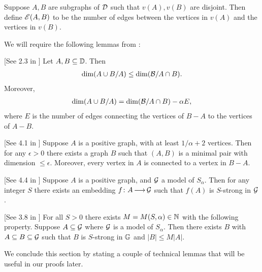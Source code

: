 \documentclass{amsart}
\begin{document}
\begin{Definition} \label{def_e}
  Suppose $A, B$ are subgraphs of $\mathcal D$ such that $v(A), v(B)$ are disjoint.
  Then define $\mathscr E(A, B)$ to be the number of edges between the vertices in $v(A)$ and the vertices in $v(B)$.
\end{Definition}

We will require the following lemmas from \cite{laskowski}:

\begin{Lemma} \label{diamond} [See 2.3 in \cite{laskowski}]
  Let $A, B \subseteq \mathbb D$.
  Then
  \begin{align*}
    \dim(A \cup B / A) \leq \dim(\mathcal B / A \cap B).
  \end{align*}
  Moreover, 
  \begin{align*}
    \dim(A \cup B / A) = \dim(\mathcal B / A \cap B) - \alpha E,
  \end{align*}
  where $E$ is the number of edges connecting the vertices of $B - A$ to the vertices of $A - B$.
\end{Lemma}

\begin{Lemma} \label{las_min} [See 4.1 in \cite{laskowski}]
  Suppose $A$ is a positive graph, with at least $1/\alpha + 2$ vertices.
  Then for any $\epsilon > 0$ there exists a graph $B$ such that $(A, B)$ is a minimal pair with dimension $\leq \epsilon$.
  Moreover, every vertex in $A$ is connected to a vertex in $B - A$.
\end{Lemma}

\begin{Lemma} \label{las_str} [See 4.4 in \cite{laskowski}]
  Suppose $A$ is a positive graph, and $\mathcal G$ a model of $S_\alpha$.
  Then for any integer $S$ there exists an embedding $f \colon A \operatorname{\longrightarrow} \mathcal G$ such that $f(A)$ is $S$-strong in $\mathcal G$.
\end{Lemma}
    
\begin{Lemma} \label{las_closure} [See 3.8 in \cite{laskowski}]
  For all $S > 0$ there exists $M = M(S, \alpha) \in \mathbb{N}$ with the following property.
  Suppose $A \subseteq \mathcal G$ where $\mathcal G$ is a model of $S_\alpha$.
  Then there exists $B$ with $A \subseteq B \subseteq \mathcal G$ such that $B$ is $S$-strong in $\mathbb G$ and $|B| \leq M|A|$.
\end{Lemma}

We conclude this section by stating a couple of technical lemmas that will be useful in our proofs later.
\end{document}
